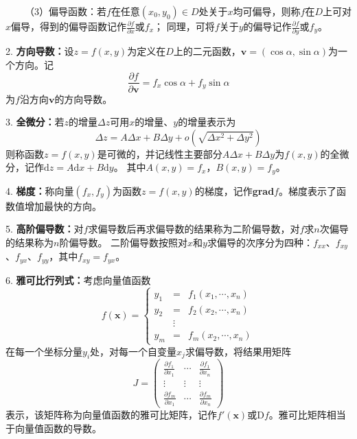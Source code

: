 ~~~~（3）偏导函数：若$f$在任意$(x_0,y_0)\in D$处关于$x$均可偏导，则称$f$在$D$上可对$x$偏导，得到的偏导函数记作$\frac{\partial f }{\partial x}$或$f_x$；
同理，可将$f$关于$y$的偏导记作$\frac{\partial f}{\partial y}$或$f_y$。

2. \textbf{方向导数：}设$z=f(x,y)$为定义在$D$上的二元函数，$\boldsymbol{v}=(\cos \alpha,\sin \alpha)$为一个方向。记
\begin{equation*}
    \frac{\partial f}{\partial\boldsymbol{v}}=f_x \cos\alpha +f_y \sin\alpha
\end{equation*}
为$f$沿方向$\boldsymbol{v}$的方向导数。

3. \textbf{全微分：}若$z$的增量$\Delta z$可用$x$的增量、$y$的增量表示为
\begin{equation*}
    \Delta z =A \Delta x +B\Delta y+o\left(\sqrt{\Delta x^2+\Delta y^2}\right)
\end{equation*}
则称函数$z=f(x,y)$是可微的，并记线性主要部分$A\Delta x +B \Delta y$为$f(x,y)$的全微分，记作$\mathrm{d}z=A\mathrm{d}x+B\mathrm{d}y$。
其中$A(x,y)=f_x$，$B(x,y)=f_y$。

4. \textbf{梯度：}称向量$(f_x,f_y)$为函数$z=f(x,y)$的梯度，记作\textbf{grad}$f$。梯度表示了函数值增加最快的方向。

5. \textbf{高阶偏导数：}对$f$求偏导数后再求偏导数的结果称为二阶偏导数，对$f$求$n$次偏导的结果称为$n$阶偏导数。
二阶偏导数按照对$x$和$y$求偏导的次序分为四种：$f_{xx}$、$f_{xy}$、$f_{yx}$、$f_{yy}$，其中$f_{xy}=f_{yx}$。

6. \textbf{雅可比行列式：}考虑向量值函数
\begin{equation*}
    f(\boldsymbol{x})=\left\{
        \begin{aligned}
            y_1 & = & f_1(x_1,\cdots,x_n)\\
            y_2 & = & f_2(x_2,\cdots,x_n)\\
        &\vdots&\\
            y_m & = & f_m(x_2,\cdots,x_n)
        \end{aligned}\right.
\end{equation*}
在每一个坐标分量$y_i$处，对每一个自变量$x_j$求偏导数，将结果用矩阵
\begin{equation*}
    J=\begin{pmatrix}
        \frac{\partial f_1}{\partial x_1} &\cdots&\frac{\partial f_1}{\partial x_n}\\
        \vdots&\vdots&\vdots\\
        \frac{\partial f_m}{\partial x_1} &\cdots&\frac{\partial f_m}{\partial x_n}
    \end{pmatrix}
\end{equation*}
表示，该矩阵称为向量值函数的雅可比矩阵，记作$f'(\boldsymbol{x})$或$\mathrm{D}f$。雅可比矩阵相当于向量值函数的导数。

